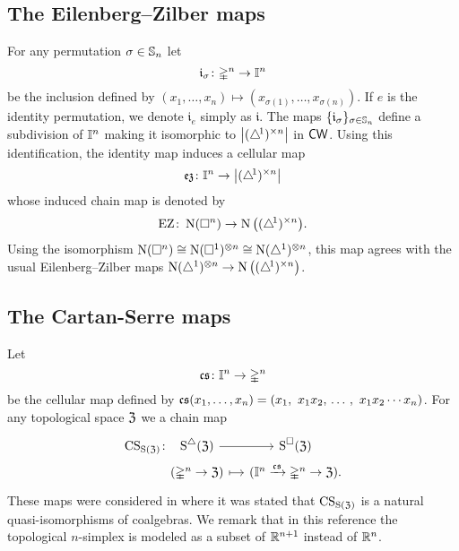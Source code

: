 \subsection{The Eilenberg--Zilber maps}

For any permutation $\sigma \in \Sym_n$ let
\[
\gi_\sigma \colon \gsimplex^n \to \gcube^n
\]
be the inclusion defined by $(x_1, \dots, x_n) \mapsto (x_{\sigma(1)}, \dots, x_{\sigma(n)})$.
If $e$ is the identity permutation, we denote $\mathfrak{i}_{e}$ simply as $\mathfrak{i}$.
The maps $\set{\mathfrak{i}_\sigma}_{\sigma \in \Sym_n}$ define a subdivision of $\gcube^n$ making it isomorphic to $\bars[\big]{\scube{n}}$ in $\CW$.
Using this identification, the identity map induces a cellular map
\[
\ez \colon \gcube^n \to \bars[\big]{\scube{n}}
\]
whose induced chain map is denoted by
\[
\EZ \colon \chains(\cube^n) \to \chains \big( \scube{n} \big).
\]
Using the isomorphism $\chains(\cube^n) \cong \chains(\cube^1)^{\ot n} \cong \chains(\simplex^1)^{\ot n}$, this map agrees with the usual Eilenberg--Zilber maps $\chains(\simplex^1)^{\ot n} \to \chains \big( \scube{n} \big)$.


\subsection{The Cartan-Serre maps}

Let
\[
\cs \colon \gcube^n \to \gsimplex^n
\]
be the cellular map defined by $\cs(x_1, \dots, x_n) = (x_1,\ x_1 x_2, \, \dots \, , \ x_1 x_2 \dotsm x_n)$.
For any topological space $\fZ$ we a chain map
\[
\begin{tikzcd} [column sep=small, row sep=0]
	\CS_{\Schains(\fZ)} \colon &[-20] \sSchains(\fZ) \arrow[r] & \cSchains (\fZ) \\ &
	(\gsimplex^n \to \fZ) \arrow[r, mapsto] & (\gcube^n \xra{\cs} \gsimplex^n \to \fZ).
\end{tikzcd}
\]
These maps were considered in \cite[p. 442]{serre1951homologie} where it was stated that $\CS_{\Schains(\fZ)}$ is a natural quasi-isomorphisms of coalgebras.
We remark that in this reference the topological $n$-simplex is modeled as a subset of $\R^{n+1}$ instead of $\R^n$.

